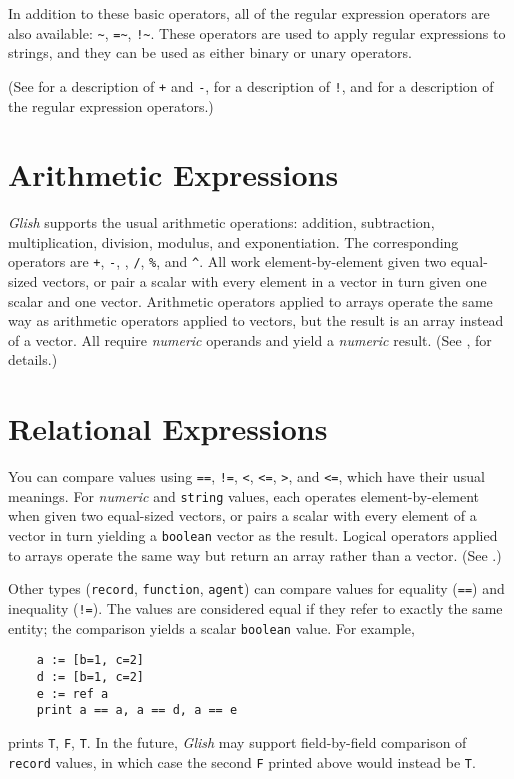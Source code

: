 In addition to these basic operators, all of the regular expression
operators are also available: \verb+~+, \verb+=~+, \verb+!~+. These
operators are used to apply regular expressions to strings, and they
can be used as either binary or unary operators.

(See  for a description of {\tt +} and {\tt -},
 for a description of {\tt !}, and 
for a description of the regular expression operators.)

\section{Arithmetic Expressions}

{\em Glish} supports the usual arithmetic operations: addition, subtraction,
multiplication, division, modulus, and exponentiation.  The corresponding
operators are {\tt +}, {\tt -}, {\tt *}, {\tt /}, {\tt \%}, and \verb+^+.
All work element-by-element given two equal-sized vectors, or pair a
scalar with every element in a vector in turn given one scalar and one vector.
Arithmetic operators applied to arrays operate the same way as arithmetic
operators applied to vectors, but the result is an array instead of a vector.
All require {\em numeric} operands and yield a {\em numeric} result.
(See , for details.)

\section{Relational Expressions}
\label{rel-exprs}

You can compare values using \verb+==+, \verb+!=+, \verb+<+, \verb+<=+,
\verb+>+, and \verb+<=+, which have their usual meanings.  For {\em numeric}
and {\tt string} values, each operates element-by-element when given two
equal-sized vectors, or pairs a scalar with every element of a vector
in turn yielding a {\tt boolean} vector as the result.  Logical operators
applied to arrays operate the same way but return an array rather than
a vector. (See .)

Other types ({\tt record}, {\tt function}, {\tt agent})
can  compare values  for equality (\verb+==+) and inequality (\verb+!=+).
The values are considered equal if they refer to exactly the same entity;
the comparison yields a scalar {\tt boolean} value.  For example,
\begin{verbatim}
    a := [b=1, c=2]
    d := [b=1, c=2]
    e := ref a
    print a == a, a == d, a == e
\end{verbatim}
prints {\tt T}, {\tt F}, {\tt T}.
In the future, {\em Glish} may support field-by-field comparison of {\tt record}
values, in which case the second {\tt F} printed above would instead
be  {\tt T}.

